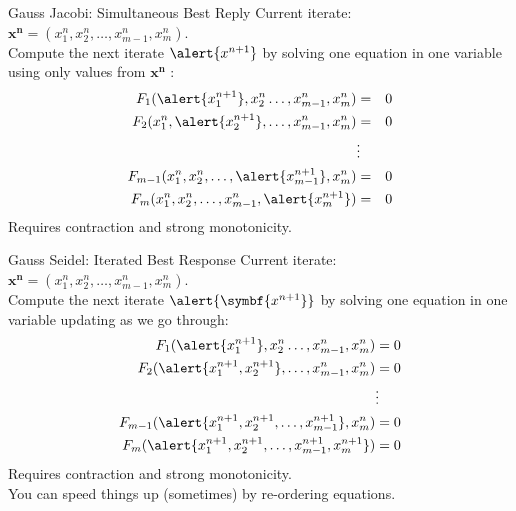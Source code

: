 \documentclass[aspectratio=169,10pt]{beamer}
\begin{document}
\begin{frame}{Gauss Jacobi: Simultaneous Best Reply}
Current iterate: $\symbf{x^n} = (x_1^n,x_2^n,\ldots,x_{m-1}^n,x_m^n)$.\\
\vspace{0.5cm}
Compute the next iterate $\alert{x^{n+1}}$ by solving one equation in one variable using only values from $\symbf{x^n}$ : 
\begin{eqnarray*}
F_1 (\alert{x_1^{n+1}},x_2^n \ldots, x_{m-1}^n, x_m^n)  &=& 0 \\
F_2  (x_1^n,\alert{x_2^{n+1}},\ldots,x_{m-1}^n,x_m^n)  &=& 0\\
&\vdots&\\ 
F_{m-1}  (x_1^n,x_2^n,\ldots,\alert{x_{m-1}^{n+1}},x_m^n)  &=& 0\\
F_m  (x_1^n,x_2^n,\ldots,x_{m-1}^n, \alert{x_m^{n+1}})  &=& 0
\end{eqnarray*}
Requires contraction and strong monotonicity.
\end{frame} 

\begin{frame}{Gauss Seidel: Iterated Best Response}
Current iterate: $\symbf{x^n} = (x_1^n,x_2^n,\ldots,x_{m-1}^n,x_m^n)$.\\
\vspace{0.5cm}
Compute the next iterate $\alert{\symbf{x^{n+1}}}$ by solving one equation in one variable updating as we go through:
\begin{align*}
F_1 (\alert{x_1^{n+1}},x_2^n \ldots, x_{m-1}^n, x_m^n)  &= 0 \\
F_2  (\alert{x_1^{n+1},x_2^{n+1}},\ldots,x_{m-1}^n,x_m^n)  &= 0\\
&\vdots\\ 
F_{m-1}  (\alert{x_1^{n+1},x_2^{n+1},\ldots,x_{m-1}^{n+1}},x_m^n)  &= 0\\
F_m (\alert{x_1^{n+1},x_2^{n+1},\ldots,x_{m-1}^{n+1}, x_m^{n+1}})  &= 0
\end{align*}
Requires contraction and strong monotonicity.\\
You can speed things up (sometimes) by re-ordering equations.

\end{frame} 
\end{document}
